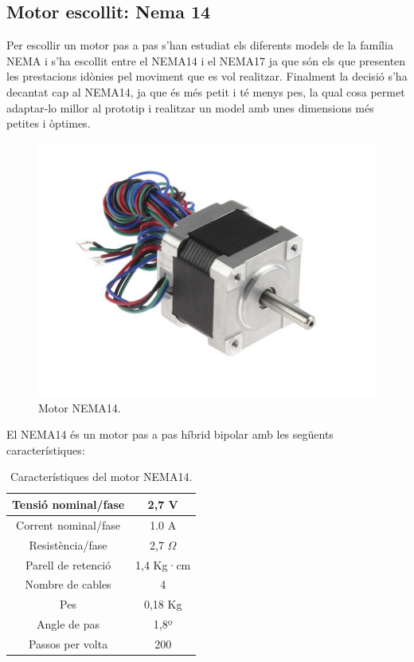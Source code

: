 \subsection{Motor escollit: Nema 14}
Per escollir un motor pas a pas s'han estudiat els diferents models de la família NEMA i s'ha escollit entre el NEMA14 i el NEMA17 ja que són els que presenten les prestacions idònies pel moviment que es vol realitzar. Finalment la decisió s'ha decantat cap al NEMA14, ja que és més petit i té menys pes, la qual cosa permet adaptar-lo millor al prototip i realitzar un model amb unes dimensions més petites i òptimes. 

\begin{figure}[H]
	\centering
	\includegraphics[scale=2]{NEMA14}
	\caption{Motor NEMA14.}
	\label{fig:NEMA14}
\end{figure}

El NEMA14 és un motor pas a pas híbrid bipolar amb les següents característiques: 

\begin{table}[htbp]
	\begin{center}
		\begin{tabular}{|c|c|}
			\hline
			
			Tensió nominal/fase & 2,7 V  \\ \hline
			Corrent nominal/fase & 1.0 A  \\ \hline
			Resistència/fase & 2,7 $\Omega$  \\ \hline
			Parell de retenció & 1,4 Kg·cm  \\ \hline
			Nombre de cables & 4  \\ \hline
			Pes & 0,18 Kg  \\ \hline
			Angle de pas & 1,8º  \\ \hline
			Passos per volta & 200  \\ \hline
		\end{tabular}
		\caption{Característiques del motor NEMA14.}
		\label{tabla:NEMA14}
	\end{center}
\end{table}



